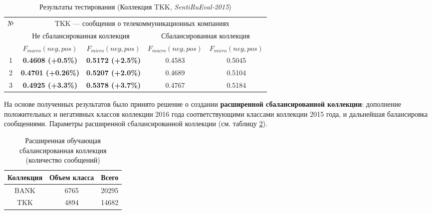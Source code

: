 \begin{table}[ht!]
\centering
\caption{Результаты тестирования (Коллекция TKK, {\it SentiRuEval-2015})}
\label{table:tkkResult2015}
\begin{tabular}{|c|c|c|c|c|}
\hline
\multirow{3}{*}{№} & \multicolumn{4}{c|}{TKK --- сообщения о телекоммуникационных компаниях}                                    \\ \cline{2-5}
                   & \multicolumn{2}{c|}{Не сбалансированная коллекция} & \multicolumn{2}{c|}{Сбалансированная коллекция} \\ \cline{2-5}
                   & $F_{macro}(neg, pos)$    & $F_{micro}(neg, pos)$   & $F_{macro}(neg, pos)$  & $F_{micro}(neg, pos)$  \\ \hline
1                  & {\bf 0.4608 (+0.5\%)}          & {\bf 0.5172 (+2.5\%)}          & 0.4583                 & 0.5045                 \\ \hline
2                  & {\bf 0.4701 (+0.26\%)}         & {\bf 0.5207 (+2.0\%)}          & 0.4689                 & 0.5104                 \\ \hline
3                  & {\bf 0.4925 (+3.3\%) }         & {\bf 0.5378 (+3.7\%)}          & 0.4767                 & 0.5184                 \\ \hline
\end{tabular}
\end{table}

%
%
На основе полученных результатов было принято решение о создании {\bf расширенной
сбалансированной коллекции}: дополнение положительных и негативных классов
коллекции 2016 года соответствующими классами коллекции 2015 года, и дальнейшая
балансировка сообщениями.
Параметры расширенной сбалансированной коллекции (см. таблицу
\ref{table:extendedCollection}).

\begin{table}[ht!]
\centering
\caption{Расширенная обучающая сбалансированная коллекция (количество сообщений)}
\label{table:extendedCollection}
\begin{tabular}{|c|c|c|}
\hline
Коллекция & Объем класса & Всего \\ \hline
BANK      & 6765         & 20295 \\ \hline
TKK       & 4894         & 14682 \\ \hline
\end{tabular}
\end{table}

